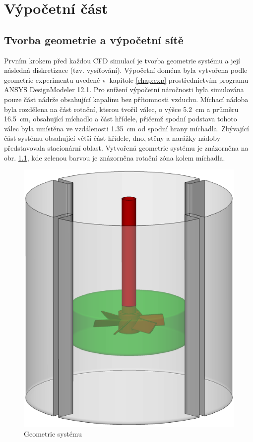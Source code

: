 \chapter{Výpočetní část}

\section{Tvorba geometrie a výpočetní sítě}

Prvním krokem před každou CFD simulací je tvorba geometrie systému a její následná diskretizace (tzv. vysíťování). Výpočetní doména byla vytvořena podle geometrie experimentu uvedené v~kapitole \ref{chap:exp} prostřednictvím programu ANSYS DesignModeler 12.1. Pro snížení výpočetní náročnosti byla simulována pouze část nádrže obsahující kapalinu bez přítomnosti vzduchu. Míchací nádoba byla rozdělena na část rotační, kterou tvořil válec, o výšce \SI{5.2}{\centi\meter} a průměru \SI{16.5}{\centi\meter}, obsahující míchadlo a část hřídele, přičemž spodní podstava tohoto válec byla umístěna ve vzdálenosti \SI{1.35}{\centi\meter} od spodní hrany míchadla. Zbývající část systému obsahující větší část hřídele, dno, stěny a narážky nádoby představovala stacionární oblast. Vytvořená geometrie systému je znázorněna na obr. \ref{fig:geo}, kde zelenou barvou je znázorněna rotační zóna kolem míchadla. 

\begin{figure}[h!]
\centering
\includegraphics[scale=0.5]{images/geo.eps}
\caption{Geometrie systému}
\label{fig:geo}
\end{figure} 

